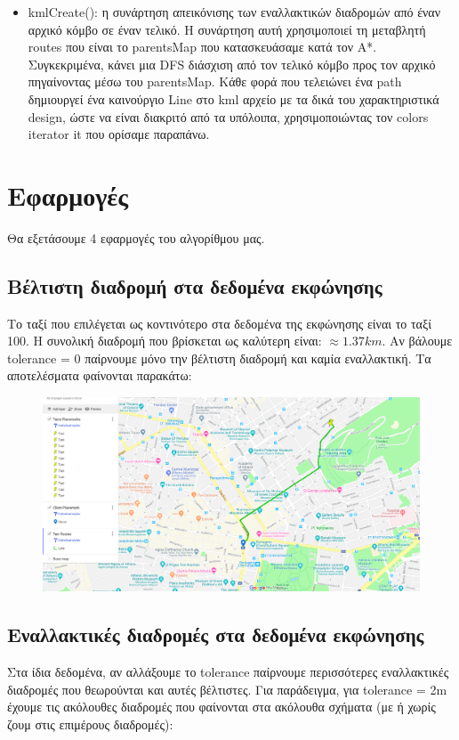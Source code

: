 \documentclass[a4paper,oneside, 11pt]{article}
\begin{document}
\begin{itemize}
\item kmlCreate(): η συνάρτηση απεικόνισης των εναλλακτικών διαδρομών από έναν αρχικό κόμβο σε έναν τελικό. Η συνάρτηση αυτή χρησιμοποιεί τη μεταβλητή routes που είναι το parentsMap που κατασκευάσαμε κατά τον A*. Συγκεκριμένα, κάνει μια DFS διάσχιση από τον τελικό κόμβο προς τον αρχικό πηγαίνοντας μέσω του parentsMap. Κάθε φορά που τελειώνει ένα path δημιουργεί ένα καινούργιο Line στο kml αρχείο με τα δικά του χαρακτηριστικά design, ώστε να είναι διακριτό από τα υπόλοιπα, χρησιμοποιώντας τον colors iterator it που ορίσαμε παραπάνω.
\end{itemize}

\section{Εφαρμογές}
Θα εξετάσουμε 4 εφαρμογές του αλγορίθμου μας.

\subsection{Βέλτιστη διαδρομή στα δεδομένα εκφώνησης}

Το ταξί που επιλέγεται ως κοντινότερο στα δεδομένα της εκφώνησης είναι το ταξί 100. Η συνολική διαδρομή που βρίσκεται ως καλύτερη είναι: $\approx 1.37 km$. Αν βάλουμε tolerance = 0 παίρνουμε μόνο την βέλτιστη διαδρομή και καμία εναλλακτική. Τα αποτελέσματα φαίνονται παρακάτω:
\begin{figure}[H]
\includegraphics[width=\textwidth]{solution.png}
\end{figure}

\subsection{Εναλλακτικές διαδρομές στα δεδομένα εκφώνησης}
Στα ίδια δεδομένα, αν αλλάξουμε το tolerance παίρνουμε περισσότερες εναλλακτικές διαδρομές που θεωρούνται και αυτές βέλτιστες. Για παράδειγμα, για tolerance = 2m έχουμε τις ακόλουθες διαδρομές που φαίνονται στα ακόλουθα σχήματα (με ή χωρίς ζουμ στις επιμέρους διαδρομές):
\end{document}
